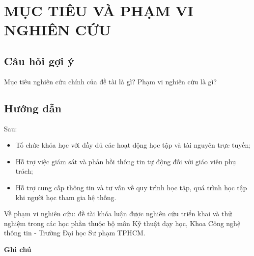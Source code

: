 \section*{MỤC TIÊU VÀ PHẠM VI NGHIÊN CỨU}
\subsection*{Câu hỏi gợi ý}
Mục tiêu nghiên cứu chính của đề tài là gì? Phạm vi nghiên cứu là gì?
\subsection*{Hướng dẫn}
Sau:
\begin{itemize}
    \item Tổ chức khóa học với đầy đủ các hoạt động học tập và tài nguyên trực tuyến;
    \item Hỗ trợ việc giám sát và phản hồi thông tin tự động đối với giáo viên phụ trách;
    \item Hỗ trợ cung cấp thông tin và tư vấn về quy trình học tập, quá trình học tập khi người học tham gia hệ thống.
\end{itemize}
Về phạm vi nghiên cứu: đề tài khóa luận được nghiên cứu triển khai và thử nghiệm trong các học phần thuộc bộ môn Kỹ thuật dạy học, Khoa Công nghệ thông tin - Trường Đại học Sư phạm TPHCM.

\textbf{Ghi chú}